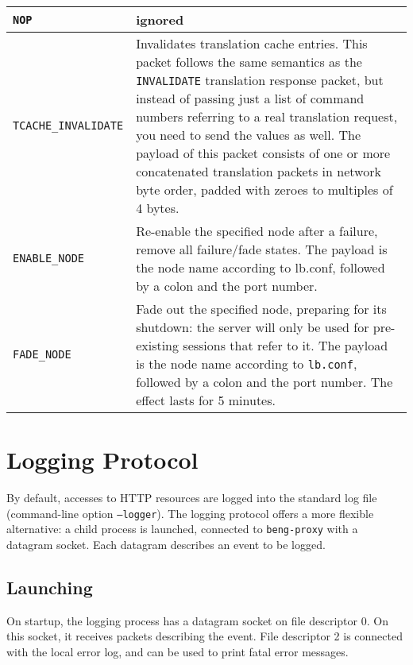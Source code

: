 \documentclass[a4paper,12pt]{article}
\begin{document}
\begin{longtable}{|l|p{8cm}|}
\hline

\texttt{NOP} & ignored \\

\hline

\verb|TCACHE_INVALIDATE| & Invalidates translation cache entries.
This packet follows the same semantics as the \verb|INVALIDATE|
translation response packet, but instead of passing just a list of
command numbers referring to a real translation request, you need to
send the values as well.  The payload of this packet consists of one
or more concatenated translation packets in network byte order, padded
with zeroes to multiples of 4 bytes.  \\

\hline

\verb|ENABLE_NODE| & Re-enable the specified node after a failure,
remove all failure/fade states.  The payload is the node name
according to lb.conf, followed by a colon and the port number. \\

\hline

\verb|FADE_NODE| & Fade out the specified node, preparing for its
shutdown: the server will only be used for pre-existing sessions that
refer to it.  The payload is the node name according to
\texttt{lb.conf}, followed by a colon and the port number.  The effect
lasts for 5 minutes. \\

\hline
\end{longtable}


\section{Logging Protocol}

By default, accesses to HTTP resources are logged into the standard
log file (command-line option \texttt{--logger}).  The logging
protocol offers a more flexible alternative: a child process is
launched, connected to \texttt{beng-proxy} with a datagram socket.
Each datagram describes an event to be logged.

\subsection{Launching}

On startup, the logging process has a datagram socket on file
descriptor 0.  On this socket, it receives packets describing the
event.  File descriptor 2 is connected with the local error log, and
can be used to print fatal error messages.
\end{document}
